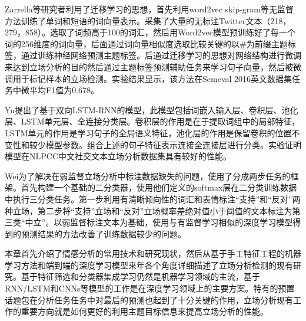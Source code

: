 Zarrella等研究者利用了迁移学习的思想，首先利用word2vec skip-gram等无监督方法训练了单词和短语的词向量表示。采集了大量的无标注Twitter文本（218，279，858）。选取了词频高于100的词汇，然后用Word2vec模型预训练好了每一个词的256维度的词向量，后面通过词向量相似度选取比较关键的以\#为前缀主题标签，通过训练神经网络预测主题标签。后通过迁移学习的思想对网络结构进行微调来达到立场分析的目的然后通过主题标签预测辅助任务来学习句子向量，然后被微调用于标记样本的立场检测。实验结果显示，该方法在Semeval 2016英文数据集任务中微平均F1值为0.678。

Yu提出了基于双向LSTM-RNN的模型，此模型包括词嵌入输入层、卷积层、池化层、LSTM单元层、全连接分类层。卷积层的作用是在于提取词组中的局部特征，LSTM单元的作用是学习句子的全局语义特征，池化层的作用是保留卷积的位置不变性和较少模型参数。组合上述的句子特征表示连接全连接层进行分类。实验证明模型在NLPCC中文社交文本立场分析数据集具有较好的性能。

Wei为了解决在弱监督立场分析中标注数据缺失的问题，使用了分成两步任务的框架。首先构建一个基础的二分类器，使用他们定义的softmax层在二分类训练数据中执行三分类任务。第一步利用有清晰倾向性的词汇和表情标注“支持”和“反对”两种立场，第二步将“支持”立场和“反对”立场概率差绝对值小于阈值的文本标注为第三类“中立”。以弱监督标注文本为基础，使用与有监督学习相似的深度学习模型得到的预测结果的方法改善了训练数据较少的问题。



本章首先介绍了情感分析的常用技术和研究现状，然后从基于手工特征工程的机器学习方法和端到端的深度学习模型来年各个角度详细描述了立场分析检测的现有研究。基于特征筛选和分类器集成学习仍然是机器学习领域的主流，基于RNN/LSTM和CNNs等模型的工作是在深度学习领域上的主要方案。特有的预置话题包在分析任务任务中对最后的预测也起到了十分关键的作用，立场分析现有工作的重要方向就是如何更好的利用主题目标信息来提高立场分析的性能。